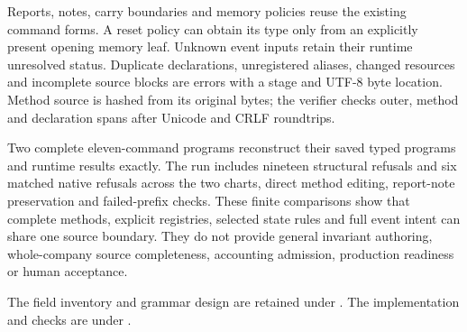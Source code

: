 Reports, notes, carry boundaries and memory policies reuse the existing command
forms. A reset policy can obtain its type only from an explicitly present
opening memory leaf. Unknown event inputs retain their runtime unresolved
status. Duplicate declarations, unregistered aliases, changed resources and
incomplete source blocks are errors with a stage and UTF-8 byte location.
Method source is hashed from its original bytes; the
verifier checks outer, method and declaration spans after Unicode and CRLF
roundtrips.

Two complete eleven-command programs reconstruct their saved typed programs
and runtime results exactly. The run includes nineteen structural refusals and
six matched native refusals across the two charts, direct method editing,
report-note preservation and failed-prefix checks. These finite comparisons
show that complete methods, explicit registries, selected state rules and full
event intent can share one source boundary. They do not provide general
invariant authoring, whole-company source completeness, accounting admission,
production readiness or human acceptance.

\begingroup\raggedright
The field inventory and grammar design are retained under
.
The implementation and checks are under
.

\par
\endgroup
